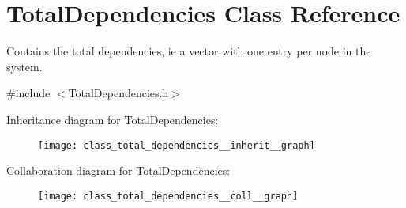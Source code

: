\hypertarget{class_total_dependencies}{}\section{Total\+Dependencies Class Reference}
\label{class_total_dependencies}


Contains the total dependencies, ie a vector with one entry per node in the system.  




{\ttfamily \#include $<$Total\+Dependencies.\+h$>$}



Inheritance diagram for Total\+Dependencies\+:\nopagebreak
\begin{figure}[H]
\begin{center}
\leavevmode
\texttt{[image: class\_total\_dependencies\_\_inherit\_\_graph]}
\end{center}
\end{figure}


Collaboration diagram for Total\+Dependencies\+:\nopagebreak
\begin{figure}[H]
\begin{center}
\leavevmode
\texttt{[image: class\_total\_dependencies\_\_coll\_\_graph]}
\end{center}
\end{figure}
